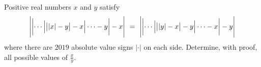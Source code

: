 Positive real numbers $x$ and $y$ satisfy
$$\Biggl|\biggl|\cdots\Bigl|\bigl||x|-y\bigr|-x\Bigr|\cdots -y\biggr|-x\Biggr|\ =\ \Biggl|\biggl|\cdots\Bigl|\bigl||y|-x\bigr|-y\Bigr|\cdots -x\biggr|-y\Biggr|$$where there are $2019$ absolute value signs $|\cdot|$ on each side. Determine, with proof, all possible values of $\frac{x}{y}$.

